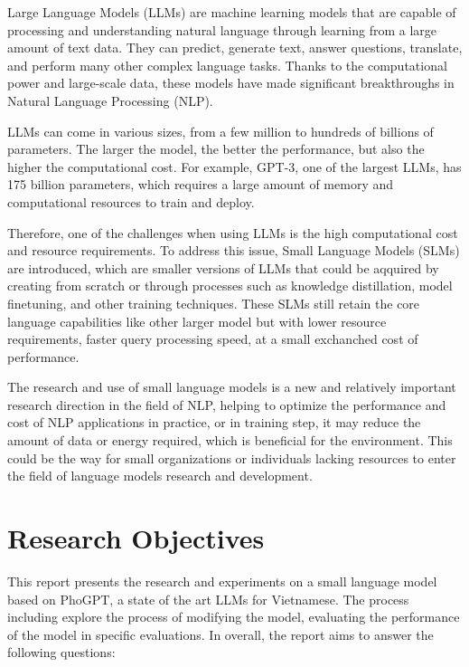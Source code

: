 \documentclass{uetgraduation}
\begin{document}
Large Language Models (LLMs) are machine learning models that are capable of processing and understanding natural language through learning from a large amount of text data. They can predict, generate text, answer questions, translate, and perform many other complex language tasks. Thanks to the computational power and large-scale data, these models have made significant breakthroughs in Natural Language Processing (NLP). \par 
LLMs can come in various sizes, from a few million to hundreds of billions of parameters. The larger the model, the better the performance, but also the higher the computational cost. For example, GPT-3, one of the largest LLMs, has 175 billion parameters, which requires a large amount of memory and computational resources to train and deploy. \par
Therefore, one of the challenges when using LLMs is the high computational cost and resource requirements. To address this issue, Small Language Models (SLMs) are introduced, which are smaller versions of LLMs that could be aqquired by creating from scratch or through processes such as knowledge distillation, model finetuning, and other training techniques. These SLMs still retain the core language capabilities like other larger model but with lower resource requirements, faster query processing speed, at a small exchanched cost of performance. \par
The research and use of small language models is a new and relatively important research direction in the field of NLP, helping to optimize the performance and cost of NLP applications in practice, or in training step, it may reduce the amount of data or energy required, which is beneficial for the environment. This could be the way for small organizations or individuals lacking resources to enter the field of language models research and development. \par

\section{Research Objectives}
This report presents the research and experiments on a small language model based on PhoGPT, a state of the art LLMs for Vietnamese. The process including explore the process of modifying the model, evaluating the performance of the model in specific evaluations. In overall, the report aims to answer the following questions: \par
\end{document}
